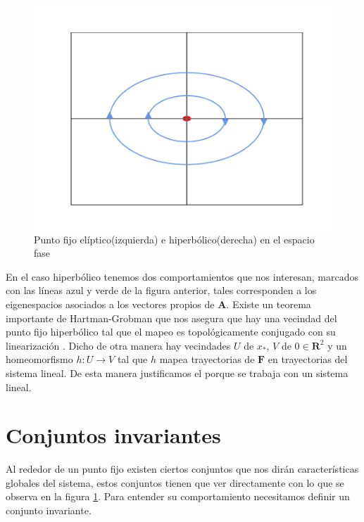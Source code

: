 \begin{figure}[h!]
\centering
\includegraphics[scale=0.3]{hyperbolic} 
\caption{Punto fijo elíptico(izquierda) e hiperbólico(derecha) en el espacio fase}\label{hiperbolic}
\end{figure}



En el caso hiperbólico tenemos dos comportamientos que nos interesan, marcados con las líneas azul y verde de la figura anterior, tales corresponden a los eigenespacios asociados a los vectores propios de $\mathbf{A}$. Existe un teorema importante de Hartman-Grobman que nos asegura que hay una vecindad del punto fijo hiperbólico tal que el mapeo es topológicamente conjugado con su linearización \cite{Meiss,Meyer,Juergen}. Dicho de otra manera hay vecindades $U$ de $x_{*}$, $V$ de $0 \in \mathbf{R}^{2}$ y un homeomorfismo $h:U\rightarrow V$ tal que $h$ mapea trayectorias de $\pmb F$ en trayectorias del sistema lineal. De esta manera justificamos el porque se trabaja con un sistema lineal.



\section{Conjuntos invariantes}
Al rededor de un punto fijo existen ciertos conjuntos que nos dirán características globales del sistema, estos conjuntos tienen que ver directamente con lo que se observa en la figura \ref{hiperbolic}. Para entender su comportamiento necesitamos definir un conjunto invariante.


